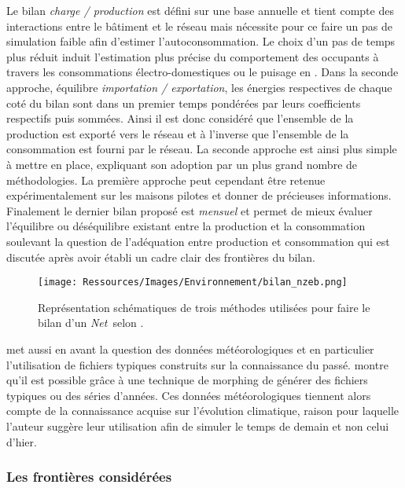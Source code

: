 Le bilan \textit{charge / production} est défini sur une base annuelle
et tient compte des interactions entre le bâtiment et le réseau mais nécessite pour
ce faire un pas de simulation faible afin d’estimer l’autoconsommation.
Le choix d’un pas de temps plus réduit induit l’estimation plus précise du comportement
des occupants à travers les consommations électro-domestiques ou le puisage en .
Dans la seconde approche, équilibre \textit{importation / exportation}, les énergies respectives
de chaque coté du bilan sont dans un premier temps pondérées par leurs coefficients
respectifs puis sommées. Ainsi il est donc considéré que l’ensemble de la production est exporté vers le réseau
et à l’inverse que l’ensemble de la consommation est fourni par le réseau. La seconde approche est ainsi plus
simple à mettre en place, expliquant son adoption par un plus grand nombre de méthodologies.
La première approche peut cependant être retenue expérimentalement sur les maisons pilotes
et donner de précieuses informations. Finalement le dernier bilan proposé est \textit{mensuel} et
permet de mieux évaluer l’équilibre ou déséquilibre existant entre la production et la
consommation soulevant la question de l’adéquation entre production et consommation
qui est discutée après avoir établi un cadre clair des frontières du bilan.
\begin{figure}
    \centering
    \texttt{[image: Ressources/Images/Environnement/bilan\_nzeb.png]}
    \caption{Représentation schématiques de trois méthodes utilisées pour faire
             le bilan d’un \textit{Net}\, selon \textcite{Sartori2012220}.}
    \label{fig:bilan_zeb}
\end{figure}

\textcite{Sartori2010} met aussi en avant la question des données météorologiques
et en particulier l’utilisation de fichiers typiques construits sur la connaissance
du passé. \textcite{Robert2012150} montre qu’il est possible grâce à une technique de morphing
\parencite{Belcher200549} de générer des fichiers typiques ou des séries d’années. Ces
données météorologiques tiennent alors compte de la connaissance acquise sur l’évolution
climatique, raison pour laquelle l’auteur suggère leur utilisation afin de simuler
le temps de demain et non celui d’hier.


\subsubsection{Les frontières considérées} %
\label{ssub:les_frontieres_considerees}
